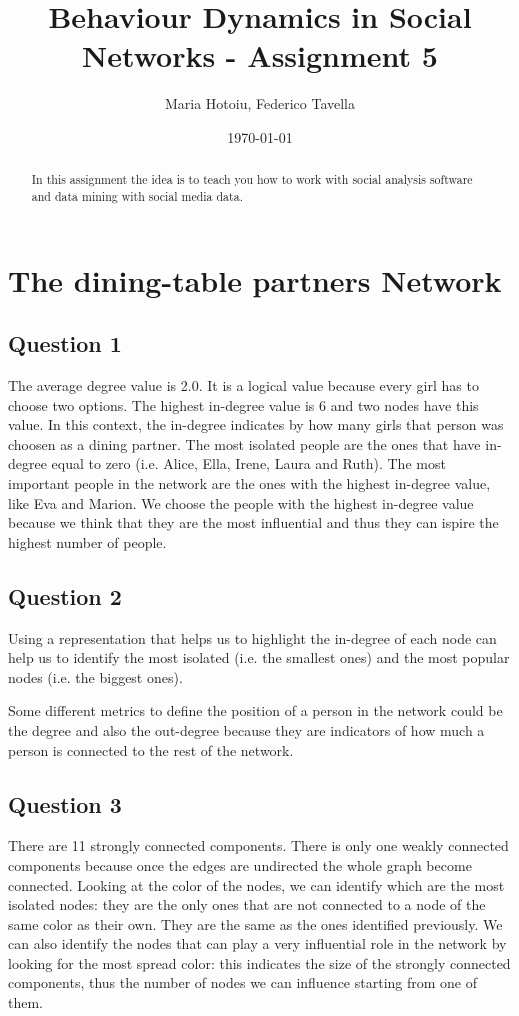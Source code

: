 \documentclass[a4paper]{article}
\title{Behaviour Dynamics in Social Networks - Assignment 5}
\author{Maria Hotoiu, Federico Tavella}
\date{\today}
\begin{document}
\maketitle

\begin{abstract}
In this assignment the idea is to teach you how to work with social analysis software and data mining with social media data.
\end{abstract}

\section{The dining-table partners Network}

\subsection{Question 1}

The average degree value is 2.0. It is a logical value because every girl has to choose two options. The highest in-degree value is 6 and two nodes have this value. In this context, the in-degree indicates by how many girls that person was choosen as a dining partner. The most isolated people are the ones that have in-degree equal to zero (i.e. Alice, Ella, Irene, Laura and Ruth). The most important people in the network are the ones with the highest in-degree value, like Eva and Marion. We choose the people with the highest in-degree value because we think that they are the most influential and thus they can ispire the highest number of people.

\subsection{Question 2}

Using a representation that helps us to highlight the in-degree of each node can help us to identify the most isolated (i.e. the smallest ones) and the most popular nodes (i.e. the biggest ones).

Some different metrics to define the position of a person in the network could be the degree and also the out-degree because they are indicators of how much a person is connected to the rest of the network.

\subsection{Question 3}

There are 11 strongly connected components. There is only one weakly connected components because once the edges are undirected the whole graph become connected. Looking at the color of the nodes, we can identify which are the most isolated nodes: they are the only ones that are not connected to a node of the same color as their own. They are the same as the ones identified previously. We can also identify the nodes that can play a very influential role in the network by looking for the most spread color: this indicates the size of the strongly connected components, thus the number of nodes we can influence starting from one of them.
\end{document}
